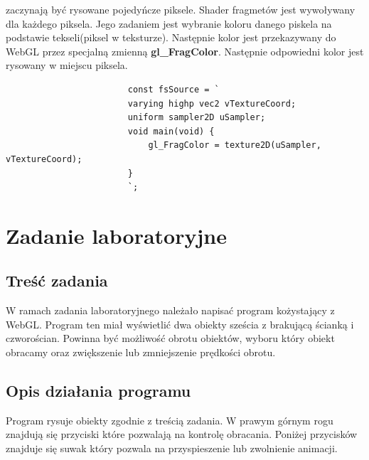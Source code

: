 \documentclass{article}
\begin{document}
\begin{enumerate}
                zaczynają być rysowane pojedyńcze piksele. Shader fragmetów jest wywoływany dla każdego piksela. Jego zadaniem
                jest wybranie koloru danego piskela na podstawie tekseli(piksel w teksturze). Następnie kolor jest przekazywany
                do WebGL przez specjalną zmienną \textbf{gl\_FragColor}. Następnie odpowiedni kolor jest rysowany w miejscu piksela.
                \begin{frame}
                    \scriptsize
                    \begin{verbatim}
                        const fsSource = `
                        varying highp vec2 vTextureCoord;
                        uniform sampler2D uSampler;
                        void main(void) {
                            gl_FragColor = texture2D(uSampler, vTextureCoord);
                        }
                        `;
                    \end{verbatim}
                    \vspace{1em}
                    \label{lst:fsSource}
                \end{frame}
            \end{enumerate}
    \section{Zadanie laboratoryjne}
        \raggedright
        \subsection{Treść zadania}
            W ramach zadania laboratoryjnego należało napisać program kożystający z WebGL.
            Program ten miał wyświetlić dwa obiekty sześcia z brakującą ścianką i czworościan.
            Powinna być możliwość obrotu obiektów, wyboru który obiekt obracamy oraz zwiększenie
            lub zmniejszenie prędkości obrotu.
        \subsection{Opis działania programu}
            Program rysuje obiekty zgodnie z treścią zadania. W prawym górnym rogu znajdują się 
            przyciski które pozwalają na kontrolę obracania. Poniżej przycisków znajduje się suwak
            który pozwala na przyspieszenie lub zwolnienie animacji.
\end{document}
